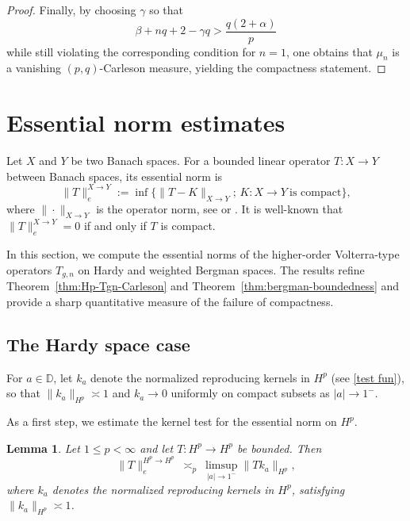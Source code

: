 \documentclass[preprint,12pt]{elsarticle}
\numberwithin{equation}{section}
\newtheorem{lemma}{Lemma}[section]
\theoremstyle{remark}
\begin{document}
\begin{proof}
Finally, by choosing $\gamma$ so that
\begin{equation*}
\beta+nq+2-\gamma q > \frac{q(2+\alpha)}{p}
\end{equation*}
while still violating the corresponding condition for $n=1$, one obtains that $\mu_n$
is a vanishing $(p,q)$-Carleson measure, yielding the compactness statement.
\end{proof}



\section{Essential norm estimates}\label{sec:essential-norms}

Let $X$ and $Y$ be two Banach spaces.
For a bounded linear operator $T:X\to Y$ between Banach spaces, its essential norm is
\begin{equation*}
\|T\|_{e}^{X\to Y}:=\inf\{\|T-K\|_{X\to Y};\,  K:X\to Y\ \text{is compact}\},
\end{equation*}
where $\|\cdot\|_{X\to Y}$ is the operator norm, see \cite[p. 583]{zhou-zhu} or \cite{Shapiro}.
It is well-known that $\|T\|_{e}^{X\to Y}=0$ if and only if $T$ is compact.

In this section, we compute the essential norms of the higher-order Volterra-type operators
$T_{g,n}$ on Hardy and weighted Bergman spaces. The results refine Theorem~\ref{thm:Hp-Tgn-Carleson} and Theorem~\ref{thm:bergman-boundedness} and provide a sharp quantitative measure of the failure of compactness.

\subsection{The Hardy space case}\label{subsec:essential-Hardy}

For $a\in\mathbb D$, let $k_a$ denote the normalized reproducing kernels in $H^p$ (see \eqref{test fun}), so that $\|k_a\|_{H^p}\asymp 1$ and $k_a\to 0$ uniformly on compact subsets as $|a|\to 1^-$.

As a first step, we estimate the kernel test for the essential norm on $H^p$.

\begin{lemma}\label{lem:ess-kernel-Hp}
Let $1\le p<\infty$ and let $T:H^p\to H^p$ be bounded. Then
\begin{equation}\label{eq:ess-kernel-Hp}
\|T\|_{e}^{H^p\to H^p}\ \asymp_p\ \limsup_{|a|\to 1^-}\|Tk_a\|_{H^p},
\end{equation}
where $k_a$ denotes the normalized reproducing kernels in $H^p$, satisfying $\|k_a\|_{H^p}\asymp 1$.
\end{lemma}
\end{document}
